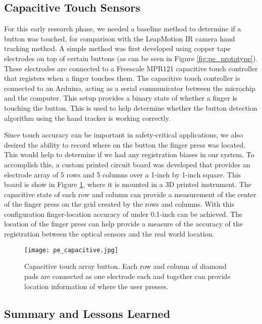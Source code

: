 \subsection{Capacitive Touch Sensors}

For this early research phase, we needed a baseline method to determine if a button was touched, for comparison with the LeapMotion IR camera hand tracking method.
A simple method was first developed using copper tape electrodes on top of certain buttons (as can be seen in Figure \ref{fig:pe_prototype}).
These electrodes are connected to a Freescale MPR121 capacitive touch controller that registers when a finger touches them.
The capacitive touch controller is connected to an Arduino, acting as a serial communicator between the microchip and the computer.
This setup provides a binary state of whether a finger is touching the button.
This is used to help determine whether the button detection algorithm using the hand tracker is working correctly.

Since touch accuracy can be important in safety-critical applications, we also desired the ability to record where on the button the finger press was located.
This would help to determine if we had any registration biases in our system.
To accomplish this, a custom printed circuit board was developed that provides an electrode array of 5 rows and 5 columns over a 1-inch by 1-inch square.
This board is show in Figure \ref{fig:pe_capacitive}, where it is mounted in a 3D printed instrument.
The capacitive state of each row and column can provide a measurement of the center of the finger press on the grid created by the rows and columns.
With this configuration finger-location accuracy of under 0.1-inch can be achieved.
The location of the finger press can help provide a measure of the accuracy of the registration between the optical sensors and the real world location.

\begin{figure}
    \centering
    \texttt{[image: pe\_capacitive.jpg]}
    \caption{Capacitive touch array button. Each row and column of diamond pads are connected as one electrode each and together can provide location information of where the user presses.}
    \label{fig:pe_capacitive}
\end{figure}

\subsection{Summary and Lessons Learned}

